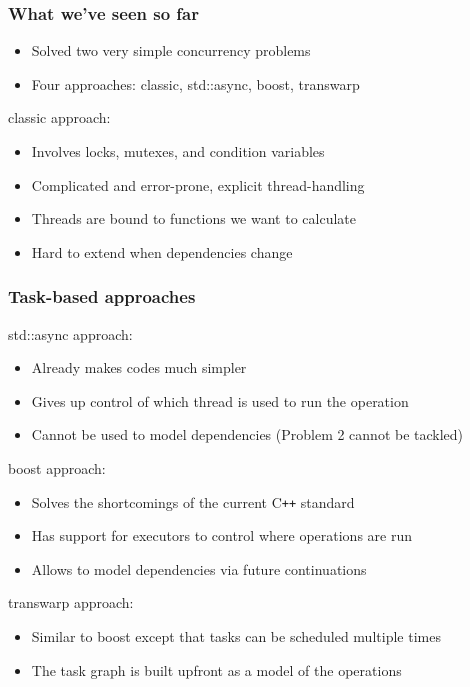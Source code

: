 \documentclass[12pt,aspectratio=169]{beamer}
\begin{document}
\begin{frame}[fragile]
\frametitle{What we've seen so far}

\begin{itemize}
\item Solved two very simple concurrency problems
\item Four approaches: classic, std::async, boost, transwarp
\end{itemize}

\bigskip

classic approach:
\begin{itemize}
\item Involves locks, mutexes, and condition variables
\item Complicated and error-prone, explicit thread-handling
\item Threads are bound to functions we want to calculate
\item Hard to extend when dependencies change
\end{itemize}
\end{frame}

\begin{frame}[fragile]
\frametitle{Task-based approaches}

std::async approach:
\begin{itemize}
\item Already makes codes much simpler
\item Gives up control of which thread is used to run the operation
\item Cannot be used to model dependencies (Problem 2 cannot be tackled)
\end{itemize}
\medskip

boost approach:
\begin{itemize}
\item Solves the shortcomings of the current C\texttt{++} standard
\item Has support for executors to control where operations are run
\item Allows to model dependencies via future continuations
\end{itemize}
\medskip

transwarp approach:
\begin{itemize}
\item Similar to boost except that tasks can be scheduled multiple times
\item The task graph is built upfront as a model of the operations
\end{itemize}
\end{frame}
\end{document}
